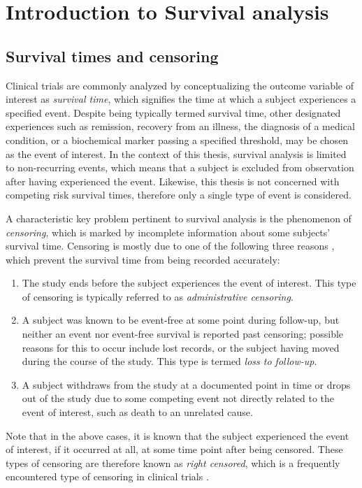\documentclass[main.tex]{subfiles}
\begin{document}
\graphicspath{{images/}}
\section{Introduction to Survival analysis}
\subsection{Survival times and censoring}
Clinical trials are commonly analyzed by conceptualizing the outcome variable of interest as \textit{survival time}, which signifies the time at which a subject experiences a specified event. Despite being typically termed survival time, other designated experiences such as remission, recovery from an illness, the diagnosis of a medical condition, or a biochemical marker passing a specified threshold, may be chosen as the event of interest. In the context of this thesis, survival analysis is limited to non-recurring events, which means that a subject is excluded from observation after having experienced the event. Likewise, this thesis is not concerned with competing risk survival times, therefore only a single type of event is considered.

A characteristic key problem pertinent to survival analysis is the phenomenon of \textit{censoring}, which is marked by incomplete information about some subjects' survival time. Censoring is mostly due to one of the following three reasons \parencite{ref1}, which prevent the survival time from being recorded accurately:
\begin{enumerate}
    \item The study ends before the subject experiences the event of interest. This type of censoring is typically referred to as \textit{administrative censoring}.
    \item A subject was known to be event-free at some point during follow-up, but neither an event nor event-free survival is reported past censoring; possible reasons for this to occur include lost records, or the subject having moved during the course of the study. This type is termed \textit{loss to follow-up}.
    \item A subject withdraws from the study at a documented point in time or drops out of the study due to some competing event not directly related to the event of interest, such as death to an unrelated cause.
\end{enumerate}
Note that in the above cases, it is known that the subject experienced the event of interest, if it occurred at all, at some time point after being censored. These types of censoring are therefore known as \textit{right censored}, which is a frequently encountered type of censoring in clinical trials \cite{prinja2010censoring} \textcite{prinja2010censoring} \parencite{prinja2010censoring}.
\cite{prinja2010censoring}
\end{document}
